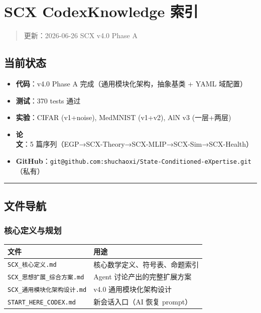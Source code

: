 \documentclass[
  12pt,
]{ctexart}
\author{SCX}
\date{2026}
\providecommand{\tightlist}{%
  \setlength{\itemsep}{0pt}\setlength{\parskip}{0pt}}
\begin{document}
\section{SCX CodexKnowledge 索引}\label{scx-codexknowledge-ux7d22ux5f15}

\begin{quote}
更新：2026-06-26 \textbar{} SCX v4.0 Phase A
\end{quote}

\subsection{当前状态}\label{ux5f53ux524dux72b6ux6001}

\begin{itemize}
\tightlist
\item
  \textbf{代码}：v4.0 Phase A 完成（通用模块化架构，抽象基类 + YAML
  域配置）
\item
  \textbf{测试}：370 tests 通过
\item
  \textbf{实验}：CIFAR (v1+noise), MedMNIST (v1+v2), AlN v3 (一层+两层)
\item
  \textbf{论文}：5 篇序列（EGP→SCX-Theory→SCX-MLIP→SCX-Sim→SCX-Health）
\item
  \textbf{GitHub}：\texttt{git@github.com:shuchaoxi/State-Conditioned-eXpertise.git}（私有）
\end{itemize}

\begin{center}\rule{0.5\linewidth}{0.5pt}\end{center}

\subsection{文件导航}\label{ux6587ux4ef6ux5bfcux822a}

\subsubsection{核心定义与规划}\label{ux6838ux5fc3ux5b9aux4e49ux4e0eux89c4ux5212}

\begin{longtable}[]{@{}ll@{}}
\toprule\noalign{}
文件 & 用途 \\
\midrule\noalign{}
\endhead
\bottomrule\noalign{}
\endlastfoot
\texttt{SCX\_核心定义.md} & 核心数学定义、符号表、命题索引 \\
\texttt{SCX\_思想扩展\_综合方案.md} & Agent 讨论产出的完整扩展方案 \\
\texttt{SCX\_通用模块化架构设计.md} & v4.0 通用模块化架构设计 \\
\texttt{START\_HERE\_CODEX.md} & 新会话入口（AI 恢复 prompt） \\
\end{longtable}
\end{document}
